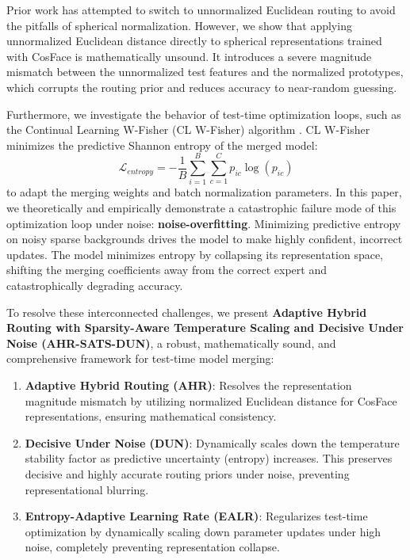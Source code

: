 \documentclass{article}
\theoremstyle{plain}
\theoremstyle{definition}
\theoremstyle{remark}
\begin{document}
Prior work has attempted to switch to unnormalized Euclidean routing to avoid the pitfalls of spherical normalization. However, we show that applying unnormalized Euclidean distance directly to spherical representations trained with CosFace is mathematically unsound. It introduces a severe magnitude mismatch between the unnormalized test features and the normalized prototypes, which corrupts the routing prior and reduces accuracy to near-random guessing.

Furthermore, we investigate the behavior of test-time optimization loops, such as the Continual Learning W-Fisher (CL W-Fisher) algorithm \cite{bkcomerge2026}. CL W-Fisher minimizes the predictive Shannon entropy of the merged model:
\begin{equation}
    \mathcal{L}_{entropy} = -\frac{1}{B}\sum_{i=1}^B \sum_{c=1}^C p_{ic} \log(p_{ic})
\end{equation}
to adapt the merging weights and batch normalization parameters. In this paper, we theoretically and empirically demonstrate a catastrophic failure mode of this optimization loop under noise: \textbf{noise-overfitting}. Minimizing predictive entropy on noisy sparse backgrounds drives the model to make highly confident, incorrect updates. The model minimizes entropy by collapsing its representation space, shifting the merging coefficients away from the correct expert and catastrophically degrading accuracy.

To resolve these interconnected challenges, we present \textbf{Adaptive Hybrid Routing with Sparsity-Aware Temperature Scaling and Decisive Under Noise (AHR-SATS-DUN)}, a robust, mathematically sound, and comprehensive framework for test-time model merging:
\begin{enumerate}
    \item \textbf{Adaptive Hybrid Routing (AHR)}: Resolves the representation magnitude mismatch by utilizing normalized Euclidean distance for CosFace representations, ensuring mathematical consistency.
    \item \textbf{Decisive Under Noise (DUN)}: Dynamically scales down the temperature stability factor as predictive uncertainty (entropy) increases. This preserves decisive and highly accurate routing priors under noise, preventing representational blurring.
    \item \textbf{Entropy-Adaptive Learning Rate (EALR)}: Regularizes test-time optimization by dynamically scaling down parameter updates under high noise, completely preventing representation collapse.
\end{enumerate}
\end{document}
